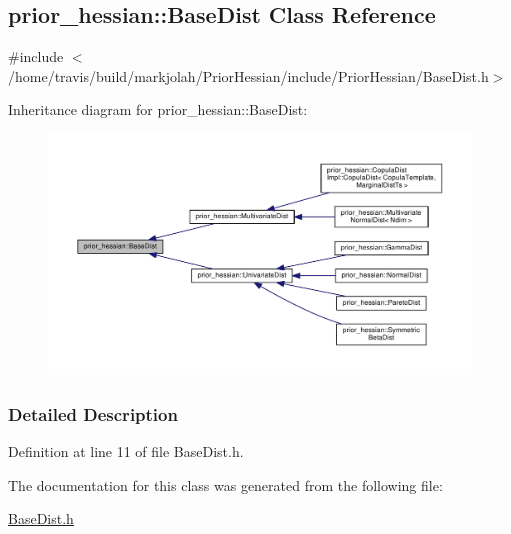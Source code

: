 \hypertarget{classprior__hessian_1_1BaseDist}{}\subsection{prior\+\_\+hessian\+:\+:Base\+Dist Class Reference}
\label{classprior__hessian_1_1BaseDist}


{\ttfamily \#include $<$/home/travis/build/markjolah/\+Prior\+Hessian/include/\+Prior\+Hessian/\+Base\+Dist.\+h$>$}



Inheritance diagram for prior\+\_\+hessian\+:\+:Base\+Dist\+:\nopagebreak
\begin{figure}[H]
\begin{center}
\leavevmode
\includegraphics[width=350pt]{classprior__hessian_1_1BaseDist__inherit__graph}
\end{center}
\end{figure}


\subsubsection{Detailed Description}


Definition at line 11 of file Base\+Dist.\+h.



The documentation for this class was generated from the following file\+:\begin{DoxyCompactItemize}
\item 
\hyperlink{BaseDist_8h}{Base\+Dist.\+h}\end{DoxyCompactItemize}
